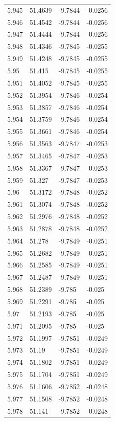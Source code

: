 \begin{tabular}{llll}
5.945 & 51.4639 & -9.7844 & -0.0256 \\
5.946 & 51.4542 & -9.7844 & -0.0256 \\
5.947 & 51.4444 & -9.7844 & -0.0256 \\
5.948 & 51.4346 & -9.7845 & -0.0255 \\
5.949 & 51.4248 & -9.7845 & -0.0255 \\
5.95 & 51.415 & -9.7845 & -0.0255 \\
5.951 & 51.4052 & -9.7845 & -0.0255 \\
5.952 & 51.3954 & -9.7846 & -0.0254 \\
5.953 & 51.3857 & -9.7846 & -0.0254 \\
5.954 & 51.3759 & -9.7846 & -0.0254 \\
5.955 & 51.3661 & -9.7846 & -0.0254 \\
5.956 & 51.3563 & -9.7847 & -0.0253 \\
5.957 & 51.3465 & -9.7847 & -0.0253 \\
5.958 & 51.3367 & -9.7847 & -0.0253 \\
5.959 & 51.327 & -9.7847 & -0.0253 \\
5.96 & 51.3172 & -9.7848 & -0.0252 \\
5.961 & 51.3074 & -9.7848 & -0.0252 \\
5.962 & 51.2976 & -9.7848 & -0.0252 \\
5.963 & 51.2878 & -9.7848 & -0.0252 \\
5.964 & 51.278 & -9.7849 & -0.0251 \\
5.965 & 51.2682 & -9.7849 & -0.0251 \\
5.966 & 51.2585 & -9.7849 & -0.0251 \\
5.967 & 51.2487 & -9.7849 & -0.0251 \\
5.968 & 51.2389 & -9.785 & -0.025 \\
5.969 & 51.2291 & -9.785 & -0.025 \\
5.97 & 51.2193 & -9.785 & -0.025 \\
5.971 & 51.2095 & -9.785 & -0.025 \\
5.972 & 51.1997 & -9.7851 & -0.0249 \\
5.973 & 51.19 & -9.7851 & -0.0249 \\
5.974 & 51.1802 & -9.7851 & -0.0249 \\
5.975 & 51.1704 & -9.7851 & -0.0249 \\
5.976 & 51.1606 & -9.7852 & -0.0248 \\
5.977 & 51.1508 & -9.7852 & -0.0248 \\
5.978 & 51.141 & -9.7852 & -0.0248 \\

\end{tabular}
